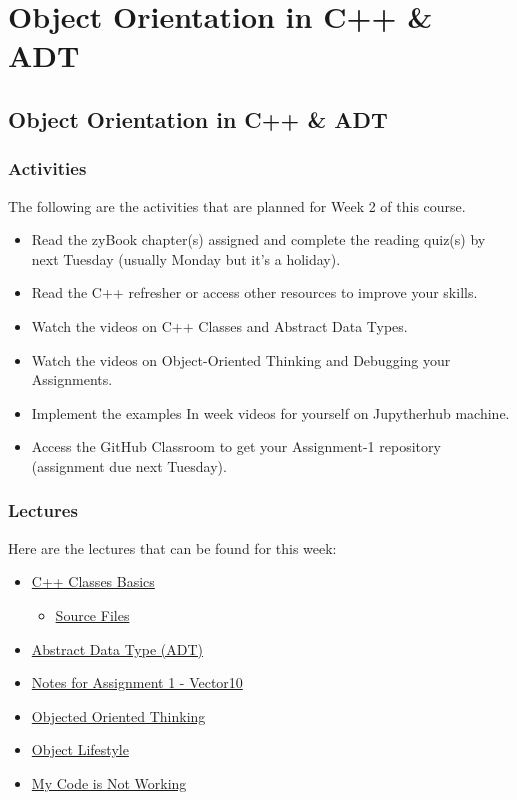 \clearpage

\renewcommand{\ChapTitle}{Object Orientation in C++ \& ADT}

\chapter{\ChapTitle}
\section{\ChapTitle}

\subsection{Activities}

The following are the activities that are planned for Week 2 of this course.

\begin{itemize}
    \item Read the zyBook chapter(s) assigned and complete the reading quiz(s) by next Tuesday (usually Monday but it's a holiday).
    \item Read the C++ refresher or access other resources to improve your skills.
    \item Watch the videos on C++ Classes and Abstract Data Types.
    \item Watch the videos on Object-Oriented Thinking and Debugging your Assignments.
    \item Implement the examples In week videos for yourself on Jupytherhub machine.
    \item Access the GitHub Classroom to get your Assignment-1 repository  (assignment due next Tuesday).
\end{itemize}

\subsection{Lectures}

Here are the lectures that can be found for this week:

\begin{itemize}
    \item \href{https://www.youtube.com/watch?v=5O2duDg0XGk}{C++ Classes Basics}
    \begin{itemize}
        \item \href{https://applied.cs.colorado.edu/mod/folder/view.php?id=45873}{Source Files}
    \end{itemize}
    \item \href{https://www.youtube.com/watch?v=AwnhJZeIM-A}{Abstract Data Type (ADT)}
    \item \href{https://www.youtube.com/watch?v=YkY2-O2ByuA}{Notes for Assignment 1 - Vector10}
    \item \href{https://applied.cs.colorado.edu/mod/hvp/view.php?id=45877}{Objected Oriented Thinking}
    \item \href{https://applied.cs.colorado.edu/mod/hvp/view.php?id=45878}{Object Lifestyle}
    \item \href{https://www.youtube.com/watch?v=uwLNltNof0A}{My Code is Not Working}
\end{itemize}

